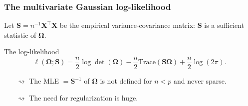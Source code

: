 \begin{frame}
  \frametitle{The multivariate Gaussian log-likelihood }

  Let  $\mathbf{S}  =  n^{-1}\mathbf{X}^\intercal \mathbf{X}$  be  the
  empirical variance-covariance  matrix: $\mathbf{S}$ is  a sufficient
  statistic of $ \boldsymbol\Omega$.

  \vfill

  \begin{block}{The log-likelihood}
    \begin{equation*}
      \ell(\boldsymbol\Omega; \mathbf{S}) =
      \frac{n}{2}     \log    \det     (\boldsymbol\Omega)  - \frac{n}{2}
      \mathrm{Trace}(\mathbf{S} \boldsymbol\Omega) + \frac{n}{2}\log(2\pi).
    \end{equation*}
  \end{block}

  \vfill

  \begin{itemize}
  \item[$\rightsquigarrow$]    The     MLE    $=\mathbf{S}^{-1}$    of
    $\boldsymbol\Omega$ is not defined for $n< p$ and never sparse.
  \item[$\rightsquigarrow$] The need for regularization is huge.
  \end{itemize}
\end{frame}


